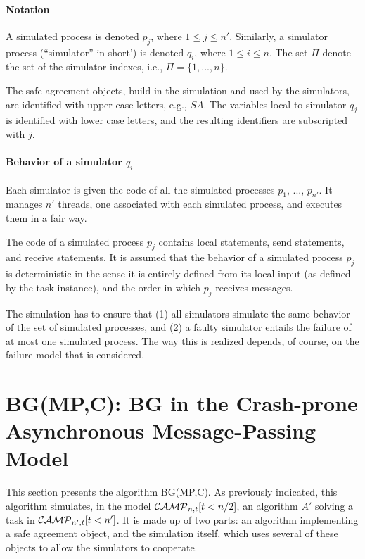 \documentclass[11pt,letterpaper]{article}
\newcommand{\CM}{{\cal CAMP}_{n,t}}
\newcommand{\CMprim}{{\cal CAMP}_{n',t}}
\newcommand{\SA}{\mathit{SA}}
\begin{document}
\paragraph{Notation}
A simulated process is denoted $p_j$, where $1 \leq j \leq n'$.
Similarly, a simulator process (``simulator'' in short') is  denoted $q_i$,
where $1 \leq i \leq n$.
The set $\Pi$ denote the set of the simulator indexes,
i.e., $\Pi =\{1,...,n\}$.

The safe agreement objects, build in the simulation and used by the simulators,
are identified with upper case letters, e.g., $\SA$.  The  variables local to
simulator $q_j$ is identified with lower case letters, and the resulting
identifiers are subscripted with $j$.


\paragraph{Behavior of a simulator $q_i$}

Each simulator is given the code of all the simulated processes
$p_1$, ..., $p_{n'}$. It manages $n'$ threads, one associated with each
simulated process, and executes them in a fair way.

The code of a simulated process $p_j$ contains local statements,
send statements, and receive statements. It is assumed that
the behavior of a simulated process $p_j$ is deterministic in the sense
it is entirely defined from its local input (as defined by the task instance),
and the order in which  $p_j$ receives messages.

The simulation has to ensure that (1) all simulators simulate the
same behavior of the set of  simulated processes, and (2) a faulty simulator
entails the failure of at most one simulated process. The way
this is realized depends, of course, on the failure model that is considered.

\section{BG(MP,C): BG in the Crash-prone Asynchronous Message-Passing  Model}
\label{sec:BG-crash-model}

This section presents the algorithm BG(MP,C).
As previously indicated, this algorithm simulates, in the model  $\CM[t<n/2]$,
an algorithm $A'$  solving a task in $\CMprim[t<n']$. It is  made up of two
parts:
an algorithm implementing a safe agreement object, and the simulation itself,
which uses several of these objects to allow the simulators to cooperate.
\end{document}

